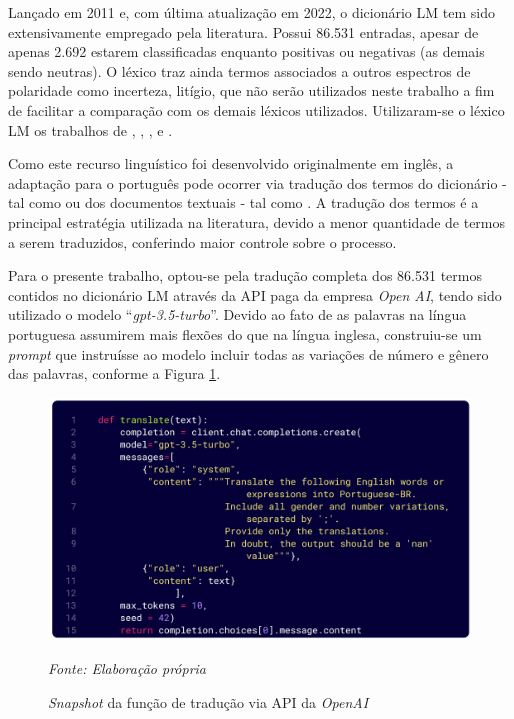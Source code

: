Lançado em 2011 e, com última atualização em 2022, o dicionário LM tem sido extensivamente empregado pela literatura. Possui 86.531 entradas, apesar de apenas 2.692 estarem classificadas enquanto positivas ou negativas (as demais sendo neutras). O léxico traz ainda termos associados a outros espectros de polaridade como incerteza, litígio, que não serão utilizados neste trabalho a fim de facilitar a comparação com os demais léxicos utilizados. Utilizaram-se o léxico LM os trabalhos de \textcite{nyman_news_2021}, \textcite{shapiro_measuring_2020}, \textcite{shapiro_taking_2021}, \textcite{januario_sentiment_2022} e \textcite{picault_media_2022}. 

Como este recurso linguístico foi desenvolvido originalmente em inglês, a adaptação para o português pode ocorrer via tradução dos termos do dicionário - tal como \textcite{januario_sentiment_2022} ou dos documentos textuais - tal como \textcite{de_melo_sentilexbr_2022}. A tradução dos termos é a principal estratégia utilizada na literatura, devido a menor quantidade de termos a serem traduzidos, conferindo maior controle sobre o processo. 

Para o presente trabalho, optou-se pela tradução completa dos 86.531 termos contidos no dicionário LM através da API paga da empresa \textit{Open AI}, tendo sido utilizado o modelo \enquote{\textit{gpt-3.5-turbo}}. Devido ao fato de as palavras na língua portuguesa assumirem mais flexões do que na língua inglesa, construiu-se um \textit{prompt} que instruísse ao modelo incluir todas as variações de número e gênero das palavras, conforme a Figura \ref{fig:figura_chamada_api_openai}.


\begin{figure}[H]
    \captionsetup{position=above} %
    \caption{\textit{Snapshot} da função de tradução via API da \textit{OpenAI}}
    \centering
    \includegraphics[scale=0.050]{imagens/figura_chamada_api_openai.jpg}
    \label{fig:figura_chamada_api_openai}
    \par\noindent
    \begin{minipage}{\textwidth}
        \centering
        \footnotesize %
        \textit{Fonte: Elaboração própria}
    \end{minipage}
\end{figure}

